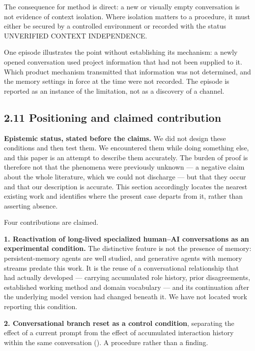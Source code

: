 The consequence for method is direct: a new or visually empty conversation is not evidence of context isolation. Where isolation matters to a procedure, it must either be secured by a controlled environment or recorded with the status UNVERIFIED CONTEXT INDEPENDENCE.

One episode illustrates the point without establishing its mechanism: a newly opened conversation used project information that had not been supplied to it. Which product mechanism transmitted that information was not determined, and the memory settings in force at the time were not recorded. The episode is reported as an instance of the limitation, not as a discovery of a channel.


\subsection*{2.11 Positioning and claimed contribution}
\label{sec:en:2.11}

\textbf{Epistemic status, stated before the claims.} We did not design these conditions and then test them. We encountered them while doing something else, and this paper is an attempt to describe them accurately. The burden of proof is therefore not that the phenomena were previously unknown — a negative claim about the whole literature, which we could not discharge — but that they occur and that our description is accurate. This section accordingly locates the nearest existing work and identifies where the present case departs from it, rather than asserting absence.

Four contributions are claimed.

\textbf{1. Reactivation of long-lived specialized human–AI conversations as an experimental condition.} The distinctive feature is not the presence of memory: persistent-memory agents are well studied, and generative agents with memory streams predate this work. It is the reuse of a conversational relationship that had actually developed — carrying accumulated role history, prior disagreements, established working method and domain vocabulary — and its continuation after the underlying model version had changed beneath it. We have not located work reporting this condition.

\textbf{2. Conversational branch reset as a control condition}, separating the effect of a current prompt from the effect of accumulated interaction history within the same conversation (). A procedure rather than a finding.

